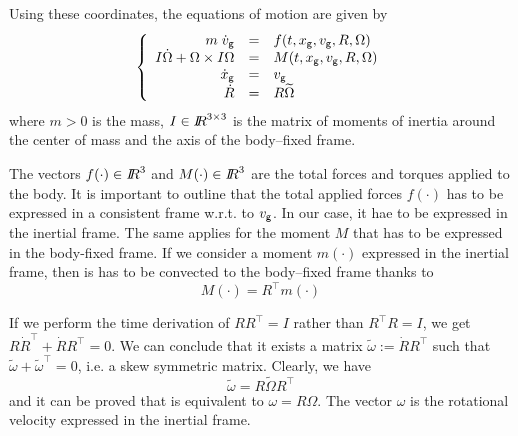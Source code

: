 Using these coordinates, the equations of motion are given by 
\begin{equation}
  \label{eq:motion-NewtonEuler}
  \left\{\begin{array}{rcl}
      m \;\dot v_{\sf \small g}  & = &f(t,x_{\sf \small g}, v_{\sf \small g},  R,  \Omega) \\
      I \dot \Omega + \Omega \times I \Omega &= & M(t,x_{\sf \small g}, v_{\sf \small g}, R, \Omega) \\
      \dot x_{\sf \small g}&=& v_{\sf \small g}\\
      \dot R  &=& R \widetilde \Omega
    \end{array}
  \right.
\end{equation}
where $m> 0$ is the mass, $I\in \mbox{\rm $I\!\!R$}^{3\times 3}$ is the matrix of moments of inertia around the center of mass and the axis of the body--fixed frame.

The vectors $f(\cdot)\in \mbox{\rm $I\!\!R$}^3$ and $M(\cdot)\in \mbox{\rm $I\!\!R$}^3$ are the total forces and torques applied to the body. It is important to outline that the total applied forces $f(\cdot)$ has to be expressed in a consistent frame w.r.t. to $v_{\sf \small g}$. In our case, it hae to be expressed in the inertial frame. The same applies for the moment $M$ that has to be expressed in the body-fixed frame. If we consider a moment $m(\cdot)$ expressed in the inertial frame, then is has to be convected to  the body--fixed frame thanks to
\begin{equation}
  \label{eq:convected_moment}
  M (\cdot) =R^\top  m (\cdot)
\end{equation}


\begin{remark}
If we perform the time derivation of $RR^\top =I$ rather than $R^\top R=I$, we get $R \dot R^\top + \dot R R^\top =0$.  We can conclude that it exists a matrix $\tilde \omega := \dot R R^\top $ such that $\tilde \omega + \tilde \omega^\top=0$, i.e. a skew symmetric matrix. Clearly, we have
 \begin{equation}
   \label{eq:4}
   \tilde \omega = R \tilde \Omega R^\top
 \end{equation}
 and it can be proved that is equivalent to $ \omega =R \Omega$. The vector $\omega$ is the rotational velocity expressed in the inertial frame.
\end{remark}

